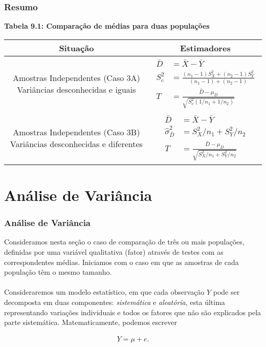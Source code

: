 \documentclass{beamer}
\begin{document}
\begin{frame}
\frametitle{Resumo}
\textbf{Tabela 9.1: Comparação de médias para duas populações}
\begin{table}[h]
\tiny
\begin{tabular}{|c|c|}
\hline
Situação  & Estimadores  \\
\hline
Amostras Independentes (Caso 3A) Variâncias desconhecidas e iguais  &  \parbox{1cm}{\begin{align*}
\bar{D} &= \bar{X}-\bar{Y} \\
S^2_c &= \frac{(n_1-1)S^2_X+(n_2-1)S^2_Y}{(n_1-1)+(n_2-1)} \\
T &= \frac{\bar{D}-\mu_D}{\sqrt{S^2_c(1/n_1 + 1/n_2)}}
\end{align*}} \\
\hline
Amostras Independentes (Caso 3B) Variâncias desconhecidas e diferentes  & \parbox{1cm}{\begin{align*}
\bar{D} &= \bar{X}-\bar{Y} \\
\hat{\sigma}_{\bar{D}}^2 &= S^2_X/n_1+S^2_Y/n_2 \\
T &= \frac{\bar{D}-\mu_D}{\sqrt{S^2_X/n_1+S^2_Y/n_2}}
\end{align*}}  \\
\hline

\end{tabular}
\end{table}
\end{frame}

\section{Análise de Variância}
\begin{frame}
\frametitle{Análise de Variância}
Consideramos nesta seção o caso de comparação de três ou mais populações, definidas por uma variável qualitativa (fator) através de testes com as correspondentes médias. Iniciamos com o caso em que as amostras de cada população têm o mesmo tamanho. \\~\\

Consideraremos um modelo estatístico, em que cada observação \(Y\) pode ser decomposta em duas componentes: \textit{sistemática} e \textit{aleatória}, esta última representando variações individuais e todos os fatores que não são explicados pela parte sistemática. Matematicamente, podemos escrever

\begin{align*}
Y = \mu+e.
\end{align*}
 
\end{frame}
\end{document}
